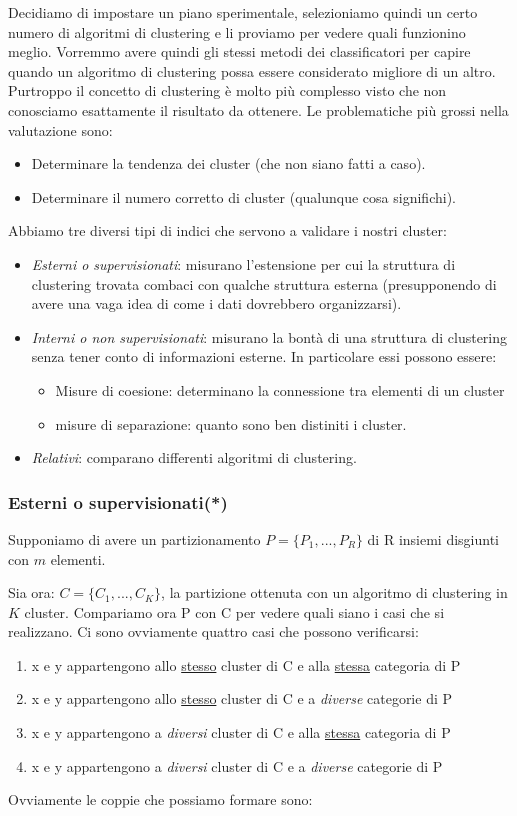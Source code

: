 Decidiamo di impostare un piano sperimentale, selezioniamo quindi  un certo numero di algoritmi di clustering e li proviamo per vedere quali funzionino meglio. Vorremmo avere quindi gli stessi metodi dei classificatori per capire quando un algoritmo di clustering possa essere considerato migliore di un altro. Purtroppo il concetto di clustering è molto più complesso visto che non conosciamo esattamente il risultato da ottenere.
Le problematiche più grossi nella valutazione sono:
\begin{itemize}
	\item Determinare la tendenza dei cluster (che non siano fatti a caso).
	\item Determinare il numero corretto di cluster (qualunque cosa significhi).
\end{itemize} 
Abbiamo tre diversi tipi di indici che servono a validare i nostri cluster:
\begin{itemize}
	\item \textit{Esterni o supervisionati}: misurano l'estensione per cui la struttura di clustering trovata combaci con qualche struttura esterna (presupponendo di avere una vaga idea di come i dati dovrebbero organizzarsi).
	\item \textit{Interni o non supervisionati}: misurano la bontà di una struttura di clustering senza tener conto di informazioni esterne. In particolare essi possono essere:
	\begin{itemize}
		\item Misure di coesione: determinano la connessione tra elementi di un cluster
		\item misure di separazione: quanto sono ben distiniti i cluster. 
	\end{itemize}
	\item \textit{Relativi}: comparano differenti algoritmi di clustering. 
\end{itemize}
\subsubsection{Esterni o supervisionati(*)}

Supponiamo di avere un partizionamento $P = \{P_{1}, ..., P_{R}\}$ di R insiemi disgiunti con $m$ elementi. 

Sia ora: $C = \{C_{1}, ..., C_{K}\}$, la partizione ottenuta con un algoritmo di clustering in $K$ cluster. Compariamo ora P con C per vedere quali siano i casi che si realizzano.
Ci sono ovviamente quattro casi che possono verificarsi:
\begin{enumerate}
	\item  x e y appartengono allo \underline{stesso} cluster di C e alla \underline{stessa} categoria di P
	\item  x e y appartengono allo \underline{stesso} cluster di C e a \textit{diverse} categorie di P
	\item  x e y appartengono a \textit{diversi} cluster di C e alla \underline{stessa} categoria di P
	\item  x e y appartengono a \textit{diversi} cluster di C e a \textit{diverse} categorie di P
\end{enumerate}
Ovviamente le coppie che possiamo formare sono:

